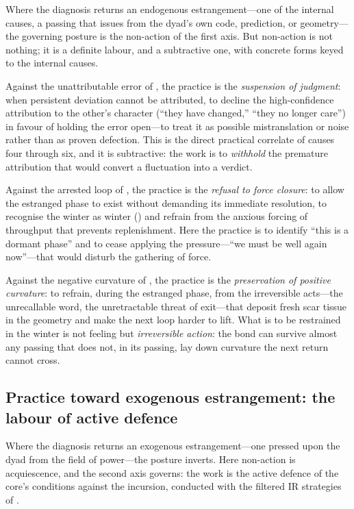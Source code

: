 Where the diagnosis returns an endogenous estrangement---one of the internal causes, a passing that issues from the dyad's own code, prediction, or geometry---the governing posture is the non-action of the first axis. But non-action is not nothing; it is a definite labour, and a subtractive one, with concrete forms keyed to the internal causes.

Against the unattributable error of , the practice is the \emph{suspension of judgment}: when persistent deviation cannot be attributed, to decline the high-confidence attribution to the other's character (``they have changed,'' ``they no longer care'') in favour of holding the error open---to treat it as possible mistranslation or noise rather than as proven defection. This is the direct practical correlate of causes four through six, and it is subtractive: the work is to \emph{withhold} the premature attribution that would convert a fluctuation into a verdict.

Against the arrested loop of , the practice is the \emph{refusal to force closure}: to allow the estranged phase to exist without demanding its immediate resolution, to recognise the winter as winter () and refrain from the anxious forcing of throughput that prevents replenishment. Here the practice is to identify ``this is a dormant phase'' and to cease applying the pressure---``we must be well again now''---that would disturb the gathering of force.

Against the negative curvature of , the practice is the \emph{preservation of positive curvature}: to refrain, during the estranged phase, from the irreversible acts---the unrecallable word, the unretractable threat of exit---that deposit fresh scar tissue in the geometry and make the next loop harder to lift. What is to be restrained in the winter is not feeling but \emph{irreversible action}: the bond can survive almost any passing that does not, in its passing, lay down curvature the next return cannot cross.

\subsection{Practice toward exogenous estrangement: the labour of active defence}
\label{p17:sub:praxis-exo}

Where the diagnosis returns an exogenous estrangement---one pressed upon the dyad from the field of power---the posture inverts. Here non-action is acquiescence, and the second axis governs: the work is the active defence of the core's conditions against the incursion, conducted with the filtered IR strategies of .

